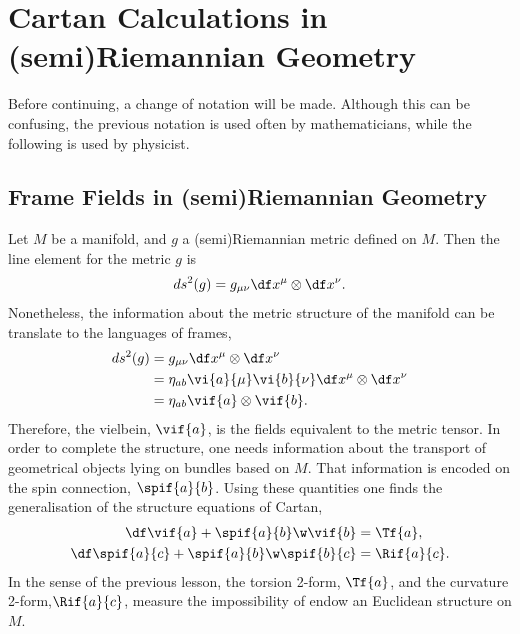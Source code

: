 
\chapter{Cartan Calculations in (semi)Riemannian Geometry}

Before continuing, a change of notation will be made. Although this can be confusing, the previous notation is used often by mathematicians, while the following is used by physicist.

\section{Frame Fields in (semi)Riemannian Geometry}


Let $M$ be a manifold, and $g$ a (semi)Riemannian metric defined on $M$. Then the line element for the metric $g$ is
\begin{align}
  ds^2(g) = g_{\mu\nu}\df x^\mu \otimes\df x^\nu.
\end{align}
Nonetheless, the information about the metric structure of the manifold can be translate to the languages of frames,
\begin{align}
  ds^2(g) &= g_{\mu\nu}\df x^\mu \otimes\df x^\nu\\
  &= \eta_{ab} \vi{a}{\mu}\vi{b}{\nu}\df x^\mu \otimes\df x^\nu\\
  &=\eta_{ab}\vif{a}\otimes\vif{b}.
\end{align}
Therefore, the vielbein, $\vif{a}$, is the fields equivalent to the metric tensor. In order to complete the structure, one needs information about the transport of geometrical objects lying on bundles based on $M$. That information is encoded on the spin connection, $\spif{a}{b}$. Using these quantities one finds  the generalisation of the structure equations of Cartan,
\begin{align}
  \df\vif{a} +\spif{a}{b}\w\vif{b} &= \Tf{a},\label{firstSE}\\
  \df\spif{a}{c}+\spif{a}{b}\w\spif{b}{c} &= \Rif{a}{c}\label{secondSE}.
\end{align}
In the sense of the previous lesson, the torsion 2-form, $\Tf{a}$, and the curvature 2-form,$\Rif{a}{c}$, measure the impossibility of endow an Euclidean structure on $M$.


